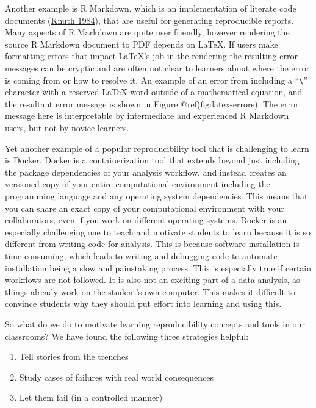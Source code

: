 \documentclass{article}
\begin{document}
Another example is R Markdown, which is an implementation of literate
code documents (\protect\hyperlink{ref-knuth1984literate}{Knuth 1984}),
that are useful for generating reproducible reports. Many aspects of R
Markdown are quite user friendly, however rendering the source R
Markdown document to PDF depends on LaTeX. If users make formatting
errors that impact LaTeX's job in the rendering the resulting error
messages can be cryptic and are often not clear to learners about where
the error is coming from or how to resolve it. An example of an error
from including a ``\texttt{\textbackslash{}}'' character with a reserved
LaTeX word outside of a mathematical equation, and the resultant error
message is shown in Figure @ref(fig:latex-errors). The error message
here is interpretable by intermediate and experienced R Markdown users,
but not by novice learners.

Yet another example of a popular reproducibility tool that is
challenging to learn is Docker. Docker is a containerization tool that
extends beyond just including the package dependencies of your analysis
workflow, and instead creates an versioned copy of your entire
computational environment including the programming language and any
operating system dependencies. This means that you can share an exact
copy of your computational environment with your collaborators, even if
you work on different operating systems. Docker is an especially
challenging one to teach and motivate students to learn because it is so
different from writing code for analysis. This is because software
installation is time consuming, which leads to writing and debugging
code to automate installation being a slow and painstaking process. This
is especially true if certain workflows are not followed. It is also not
an exciting part of a data analysis, as things already work on the
student's own computer. This makes it difficult to convince students why
they should put effort into learning and using this.

So what do we do to motivate learning reproducibility concepts and tools
in our classrooms? We have found the following three strategies helpful:

\begin{enumerate}
\def\labelenumi{\arabic{enumi}.}
\tightlist
\item
  Tell stories from the trenches
\item
  Study cases of failures with real world consequences
\item
  Let them fail (in a controlled manner)
\end{enumerate}
\end{document}

